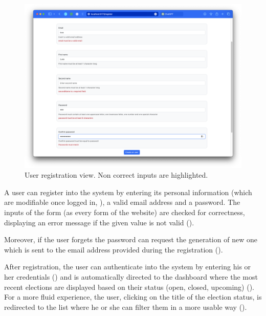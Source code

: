 \documentclass{scrartcl}
\begin{document}
\begin{figure}
    \centering
    \includegraphics[width=0.88\linewidth]{figures/story-board/4-user-registration.png}
    \caption{User registration view. Non correct inputs are highlighted.}
    \label{fig:user-registration}
\end{figure}
\restoregeometry

A user can register into the system by entering its personal information (which are modifiable once logged in, ), a valid email address and a password.
%
The inputs of the form (as every form of the website) are checked for correctness, displaying an error message if the given value is not valid ().

Moreover, if the user forgets the password can request the generation of  new one which is sent to the email address provided during the registration ().

After registration, the user can authenticate into the system by entering his or her credentials () and is automatically directed to the dashboard where the most recent elections are displayed based on their status (open, closed, upcoming) ().
%
For a more fluid experience, the user, clicking on the title of the election status, is redirected to the list where he or she can filter them in a more usable way ().
\end{document}
